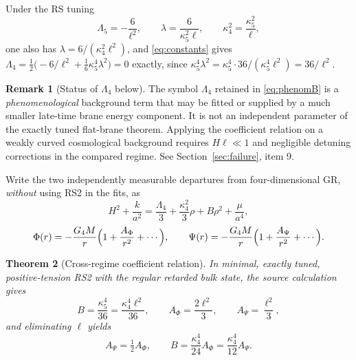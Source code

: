 \documentclass[11pt,a4paper]{article}
\theoremstyle{plain}
\newtheorem{theorem}{Theorem}[section]
\theoremstyle{definition}
\newtheorem{remark}[theorem]{Remark}
\newcommand{\kfive}{\kappa_5}
\newcommand{\kfour}{\kappa_4}
\newcommand{\Lfive}{\Lambda_5}
\newcommand{\Lfour}{\Lambda_4}
\begin{document}
Under the RS tuning
\begin{equation}
\label{eq:tuning}
\Lfive=-\frac{6}{\ell^2},
\qquad
\lambda=\frac{6}{\kfive^2\ell},
\qquad
\kfour^2=\frac{\kfive^2}{\ell},
\end{equation}
one also has $\lambda=6/(\kfour^2\ell^2)$, and \eqref{eq:constants} gives
$\Lfour=\tfrac12\bigl(-6/\ell^2+\tfrac16\kfive^4\lambda^2\bigr)=0$
exactly, since $\kfive^4\lambda^2=\kfive^4\cdot36/(\kfive^4\ell^2)
=36/\ell^2$.

\begin{remark}[Status of $\Lfour$ below]
The symbol $\Lfour$ retained in \eqref{eq:phenomB} is a
\emph{phenomenological} background term that may be fitted or supplied by
a much smaller late-time brane energy component. It is not an independent
parameter of the exactly tuned flat-brane theorem. Applying the
coefficient relation on a weakly curved cosmological background requires
$H\ell\ll1$ and negligible detuning corrections in the compared regime.
See Section~\ref{sec:failure}, item 9.
\end{remark}

Write the two independently measurable departures from four-dimensional
GR, \emph{without} using RS2 in the fits, as
\begin{equation}
\label{eq:phenomB}
H^2+\frac{k}{a^2}
=\frac{\Lfour}{3}+\frac{\kfour^2}{3}\rho
+B\rho^2+\frac{\mu}{a^4},
\end{equation}
\begin{equation}
\label{eq:phenomA}
\Phi(r)=-\frac{G_4M}{r}\Bigl(1+\frac{A_\Phi}{r^2}+\cdots\Bigr),
\qquad
\Psi(r)=-\frac{G_4M}{r}\Bigl(1+\frac{A_\Psi}{r^2}+\cdots\Bigr).
\end{equation}

\begin{theorem}[Cross-regime coefficient relation]
\label{thm:crossregime}
In minimal, exactly tuned, positive-tension RS2 with the regular retarded
bulk state, the source calculation gives
\begin{equation}
\label{eq:sourcecoeffs}
B=\frac{\kfive^4}{36}=\frac{\kfour^4\ell^2}{36},
\qquad
A_\Phi=\frac{2\ell^2}{3},
\qquad
A_\Psi=\frac{\ell^2}{3},
\end{equation}
and eliminating $\ell$ yields
\begin{equation}
\label{eq:crossregime}
\boxed{\;
A_\Psi=\tfrac12 A_\Phi,
\qquad
B=\frac{\kfour^4}{24}A_\Phi
=\frac{\kfour^4}{12}A_\Psi .
\;}
\end{equation}
\end{theorem}
\end{document}
